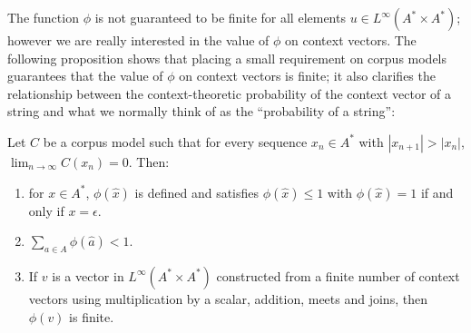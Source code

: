 The function $\phi$ is not guaranteed to be finite for all elements $u \in L^\infty(A^*\times A^*)$; however we are really interested in the value of $\phi$ on context vectors. The following proposition shows that placing a small requirement on corpus models guarantees that the value of $\phi$ on context vectors is finite; it also clarifies the relationship between the context-theoretic probability of the context vector of a string and what we normally think of as the ``probability of a string'':
\begin{prop}
Let $C$ be a corpus model such that for every sequence $x_n \in A^*$ with $|x_{n+1}| > |x_n|$, $\lim_{n \rightarrow\infty} C(x_n) = 0$. Then:
\begin{enumerate}
\item for $x \in A^*$, $\phi(\hat{x})$ is defined and satisfies $\phi(\hat{x}) \le 1$ with $\phi(\hat{x}) = 1$ if and only if $x = \epsilon$.
\item $\sum_{a \in A} \phi(\hat{a}) < 1.$
\item If $v$ is a vector in $L^\infty(A^*\times A^*)$ constructed from a finite number of context vectors using multiplication by a scalar, addition, meets and joins, then $\phi(v)$ is finite.
\end{enumerate}
\end{prop}



